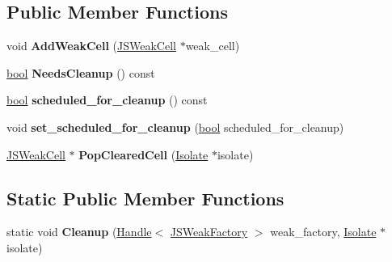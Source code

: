\subsection*{Public Member Functions}
\begin{DoxyCompactItemize}
\item 
\mbox{\label{classv8_1_1internal_1_1JSWeakFactory_ab1f9260e6849e2814c6fb65a570509b9}} 
void {\bfseries Add\+Weak\+Cell} (\mbox{\hyperlink{classv8_1_1internal_1_1JSWeakCell}{J\+S\+Weak\+Cell}} $\ast$weak\+\_\+cell)
\item 
\mbox{\label{classv8_1_1internal_1_1JSWeakFactory_ad400f6a6f04c8aa550d053331836304e}} 
\mbox{\hyperlink{classbool}{bool}} {\bfseries Needs\+Cleanup} () const
\item 
\mbox{\label{classv8_1_1internal_1_1JSWeakFactory_a65942e9fadb63f04921b310a12588b10}} 
\mbox{\hyperlink{classbool}{bool}} {\bfseries scheduled\+\_\+for\+\_\+cleanup} () const
\item 
\mbox{\label{classv8_1_1internal_1_1JSWeakFactory_acac2d25007d45cd29ae4138f49018481}} 
void {\bfseries set\+\_\+scheduled\+\_\+for\+\_\+cleanup} (\mbox{\hyperlink{classbool}{bool}} scheduled\+\_\+for\+\_\+cleanup)
\item 
\mbox{\label{classv8_1_1internal_1_1JSWeakFactory_adf61092ff5851a5a66a3f819492864f0}} 
\mbox{\hyperlink{classv8_1_1internal_1_1JSWeakCell}{J\+S\+Weak\+Cell}} $\ast$ {\bfseries Pop\+Cleared\+Cell} (\mbox{\hyperlink{classv8_1_1internal_1_1Isolate}{Isolate}} $\ast$isolate)
\end{DoxyCompactItemize}
\subsection*{Static Public Member Functions}
\begin{DoxyCompactItemize}
\item 
\mbox{\label{classv8_1_1internal_1_1JSWeakFactory_a3b11f19b499b81ed4fabb07c1764bf52}} 
static void {\bfseries Cleanup} (\mbox{\hyperlink{classv8_1_1internal_1_1Handle}{Handle}}$<$ \mbox{\hyperlink{classv8_1_1internal_1_1JSWeakFactory}{J\+S\+Weak\+Factory}} $>$ weak\+\_\+factory, \mbox{\hyperlink{classv8_1_1internal_1_1Isolate}{Isolate}} $\ast$isolate)
\end{DoxyCompactItemize}
